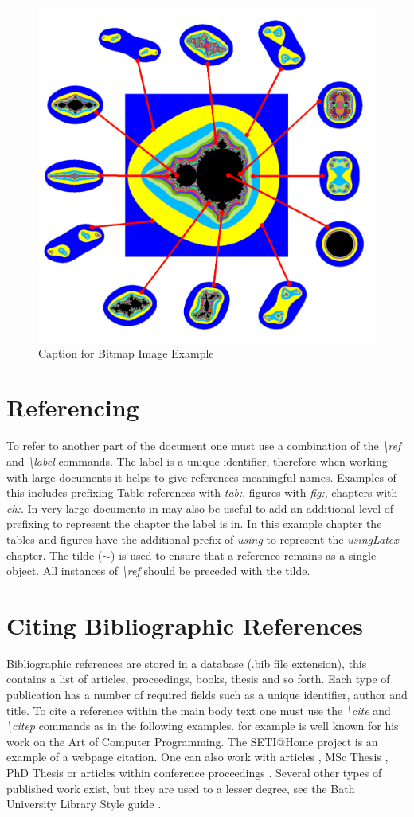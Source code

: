 \begin{figure}[H]
\begin{center}
\includegraphics[width=.34\linewidth]{usingLatex/images/samplepng}
\caption{Caption for Bitmap Image Example} \label{fig:using:samplepngImage}
\end{center}
\end{figure}

\section{Referencing}

To refer to another part of the document one must use a combination of the \emph{\textbackslash ref} and \emph{\textbackslash label} commands. The label is a unique identifier, therefore when working with large documents it helps to give references meaningful names. Examples of this includes prefixing Table references with \emph{tab:}, figures with \emph{fig:}, chapters with \emph{ch:}. In very large documents in may also be useful to add an additional level of prefixing to represent the chapter the label is in. In this example chapter the tables and figures have the additional prefix of \emph{using} to represent the \emph{usingLatex} chapter. The tilde ($\sim$) is used to ensure that a reference remains as a single object. All instances of \emph{\textbackslash ref} should be preceded with the tilde.

\section{Citing Bibliographic References}

Bibliographic references are stored in a database (.bib file extension), this contains a list of articles, proceedings, books, thesis and so forth. Each type of publication has a number of required fields such as a unique identifier, author and title. To cite a reference within the main body text one must use the \emph{\textbackslash cite} and \emph{\textbackslash citep} commands as in the following examples. \cite{book:knuth_1973} for example is well known for his work on the Art of Computer Programming. The SETI@Home project \citep{online:berkeleyBOINC} is an example of a webpage citation. One can also work with articles \citep{art:Russell:1978:Cray1}, MSc Thesis \citep{msc:Shannon:1940}, PhD Thesis \citep{phd:Sutherland:1963} or articles within conference proceedings \citep{proc:Ewald:1978:HPG}. Several other types of published work exist, but they are used to a lesser degree, see the Bath University Library Style guide \citep{online:Bath:2016:HarvardBathStyle}.

